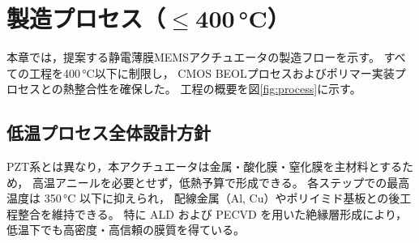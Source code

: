 \section{製造プロセス（$\leq$400\,\si{\celsius}）}

本章では，提案する静電薄膜MEMSアクチュエータの製造フローを示す。
すべての工程を400\,\si{\celsius}以下に制限し，
CMOS BEOLプロセスおよびポリマー実装プロセスとの熱整合性を確保した。
工程の概要を図\ref{fig:process}に示す。

\subsection{低温プロセス全体設計方針}
PZT系とは異なり，本アクチュエータは金属・酸化膜・窒化膜を主材料とするため，
高温アニールを必要とせず，低熱予算で形成できる。
各ステップでの最高温度は 350\,\si{\celsius} 以下に抑えられ，
配線金属（Al, Cu）やポリイミド基板との後工程整合を維持できる。
特に ALD および PECVD を用いた絶縁層形成により，
低温下でも高密度・高信頼の膜質を得ている。

